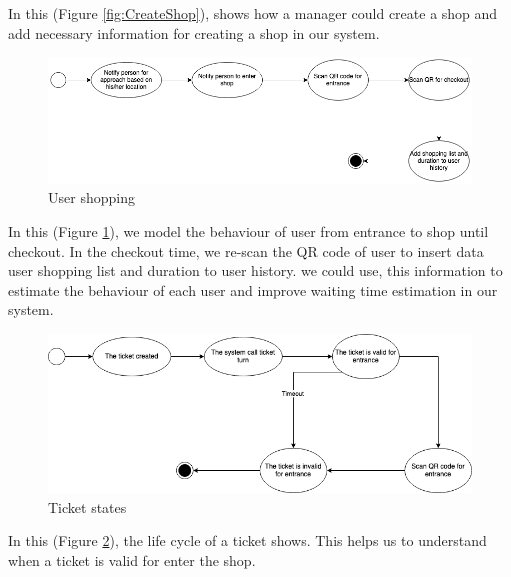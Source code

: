 In this (Figure \ref{fig:CreateShop}), shows how a manager could create a shop and add necessary information for creating a shop in our system.

\begin{figure}[H]
  \includegraphics[width=\textwidth,height=\textheight,keepaspectratio]{images/Shopping.png}
  \caption{User shopping}
  \label{fig:shopping}
\end{figure}

In this (Figure \ref{fig:shopping}), we model the behaviour of user from entrance to shop until checkout. In the checkout time, we re-scan the QR code of user to insert data user shopping list and duration to user history. we could use, this information to estimate the behaviour of each user and improve waiting time estimation in our system.

\begin{figure}[H]
  \includegraphics[width=\textwidth,height=\textheight,keepaspectratio]{images/Ticket.png}
  \caption{Ticket states}
  \label{fig:ticket}
\end{figure}

In this (Figure \ref{fig:ticket}), the life cycle of a ticket shows. This helps us to understand when a ticket is valid for enter the shop.
